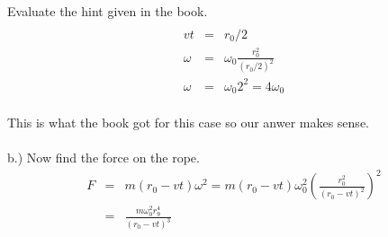 \documentclass[11pt]{amsart}
\begin{document}
Evaluate the hint given in the book. \\
\begin{eqnarray*} \\
vt &=& r_{0}/2 \\
\omega &=& \omega_{0}\frac{r_{0}^{2}}{(r_{0}/2)^{2}} \\
\omega &=& \omega_{0}2^{2} = 4\omega_{0} 
\end{eqnarray*} \\
This is what the book got for this case so our anwer makes sense. \\ \\
b.) Now find the force on the rope. \\
\begin{eqnarray*}
F &=& m(r_{0}-vt)\omega^{2} = m(r_{0}-vt)\omega_{0}^{2}(\frac{r_{0}^{2}}{(r_{0}-vt)^{2}})^{2} \\
&=& \frac{m\omega_{0}^{2}r_{9}^{4}}{(r_{0}-vt)^{3}} 
\end{eqnarray*} \\
\end{document}
